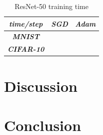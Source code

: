 \documentclass[conference]{IEEEtran}
\begin{document}
\begin{table}[htbp]
    \caption{ResNet-50 training time}
    \begin{center}
    \begin{tabular}{|c|c|c|}
    \cline{1-3} 
    \textit{time/step} & \textbf{\textit{SGD}}& \textbf{\textit{Adam}} \\
    \hline
    \textbf{\textit{MNIST}} &  &  \\
    \hline
    \textbf{\textit{CIFAR-10}} &  &  \\
    \cline{1-3} 
    \end{tabular}
    \label{tab: ResNet-50 training time}
    \end{center}
\end{table}

\section{Discussion}

\section{Conclusion}

\printbibliography
\end{document}

